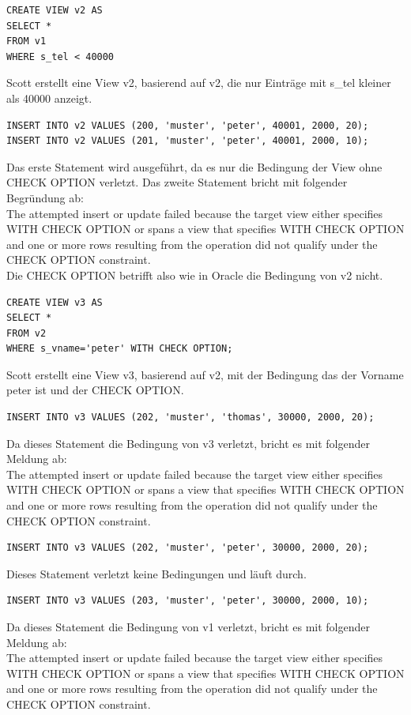 \documentclass[10pt]{scrreprt}
\begin{document}
\begin{lstlisting}[style=sql]
CREATE VIEW v2 AS
SELECT *
FROM v1
WHERE s_tel < 40000
\end{lstlisting}
Scott erstellt eine View v2, basierend auf v2, die nur Einträge mit s\_tel kleiner als 40000 anzeigt.

\begin{lstlisting}[style=sql]
INSERT INTO v2 VALUES (200, 'muster', 'peter', 40001, 2000, 20);
INSERT INTO v2 VALUES (201, 'muster', 'peter', 40001, 2000, 10);
\end{lstlisting}
Das erste Statement wird ausgeführt, da es nur die Bedingung der View ohne CHECK OPTION verletzt. Das zweite Statement bricht mit folgender Begründung ab:\\
The attempted insert or update failed because the target view either specifies WITH CHECK OPTION or spans a view that specifies WITH CHECK OPTION and one or more rows resulting from the operation did not qualify under the CHECK OPTION constraint.\\
Die CHECK OPTION betrifft also wie in Oracle die Bedingung von v2 nicht.

\begin{lstlisting}[style=sql]
CREATE VIEW v3 AS
SELECT *
FROM v2
WHERE s_vname='peter' WITH CHECK OPTION;
\end{lstlisting}
Scott erstellt eine View v3, basierend auf v2, mit der Bedingung das der Vorname peter ist und der CHECK OPTION.

\begin{lstlisting}[style=sql]
INSERT INTO v3 VALUES (202, 'muster', 'thomas', 30000, 2000, 20);
\end{lstlisting}
Da dieses Statement  die Bedingung von v3 verletzt, bricht es mit folgender Meldung ab:\\
The attempted insert or update failed because the target view either specifies WITH CHECK OPTION or spans a view that specifies WITH CHECK OPTION and one or more rows resulting from the operation did not qualify under the CHECK OPTION constraint.\\

\begin{lstlisting}[style=sql]
INSERT INTO v3 VALUES (202, 'muster', 'peter', 30000, 2000, 20);
\end{lstlisting}
Dieses Statement verletzt keine Bedingungen und läuft durch.

\begin{lstlisting}[style=sql]
INSERT INTO v3 VALUES (203, 'muster', 'peter', 30000, 2000, 10);
\end{lstlisting}
Da dieses Statement  die Bedingung von v1 verletzt, bricht es mit folgender Meldung ab:\\
The attempted insert or update failed because the target view either specifies WITH CHECK OPTION or spans a view that specifies WITH CHECK OPTION and one or more rows resulting from the operation did not qualify under the CHECK OPTION constraint.\\
\end{document}
